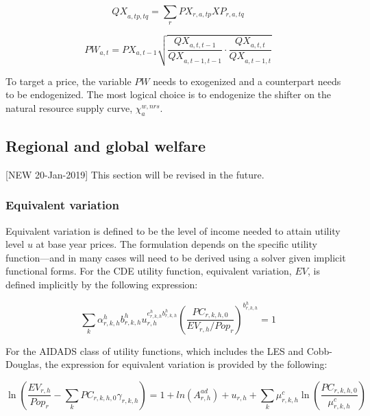 \documentclass[11pt,letterpaper]{report}
\begin{document}
\[
\mathit{QX}_{a,\mathit{tp},\mathit{tq}}
   = \sum_r{\mathit{PX}_{r,a,\mathit{tp}} \mathit{XP}_{r,a,\mathit{tq}}}
\]

\begin{equation}
\label{eq:pw}
\mathit{PW}_{a,t} = \mathit{PX}_{a,t-1} \sqrt{
   \frac {\mathit{QX}_{a,\mathit{t},   \mathit{t-1}}}
         {\mathit{QX}_{a,\mathit{t-1}, \mathit{t-1}}} \cdot
   \frac {\mathit{QX}_{a,\mathit{t},   \mathit{t}}}
         {\mathit{QX}_{a,\mathit{t-1}, \mathit{t}}} }
\end{equation}

To target a price, the variable $\mathit{PW}$ needs to exogenized and a
counterpart needs to be endogenized. The most logical choice is to endogenize
the shifter on the natural resource supply curve, $\chi^{w,\mathit{nrs}}_a$.

\subsection{Regional and global welfare}

[NEW 20-Jan-2019] This section will be revised in the future.

\subsubsection{Equivalent variation}

Equivalent variation is defined to be the level of income needed to attain
utility level $u$ at base year prices. The formulation depends on the
specific utility function---and in many cases will need to be
derived using a solver given implicit functional forms. For the CDE
utility function, equivalent variation, $\mathit{EV}$, is defined implicitly
by the following expression:

\begin{equation}
\label{eq:EVCDE}
\sum_k{\alpha^h_{r,k,h} b^h_{r,k,h} u_{r,h}^{e^h_{r,k,h} b^h_{r,k,h}} {\left(
      \frac{\mathit{PC}_{r,k,h,0}} {\mathit{EV}_{r,h}/\mathit{Pop}_r}
    \right)}^{b^h_{r,k,h}}} = 1
\end{equation}

For the AIDADS class of utility functions, which includes the LES
and Cobb-Douglas, the expression for equivalent variation is provided
by the following:

\begin{equation}
\label{eq:EVAIDADS}
\ln\left(\frac{\mathit{EV}_{r,h}}{\mathit{Pop}_r} -
\sum_k{\mathit{PC}_{r,k,h,0}\gamma_{r,k,h}}\right) =
1 + ln\left(A^{\mathit{ad}}_{r,h}\right)
+ u_{r,h} + \sum_k{\mu^c_{r,k,h} \ln\left(\frac{\mathit{PC}_{r,k,h,0}}{\mu^c_{r,k,h}} \right)}
\end{equation}
\end{document}
